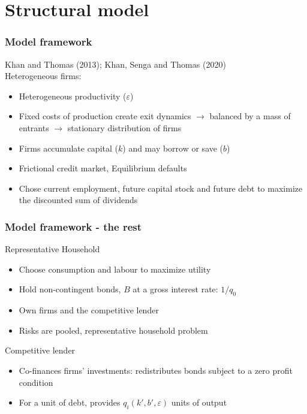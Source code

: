 \documentclass[notes]{beamer}
\begin{document}
\section{Structural model}
\begin{frame}
\frametitle{Model framework}
Khan and Thomas (2013); Khan, Senga and Thomas (2020) \vspace{10mm} \\
Heterogeneous firms: 
\begin{itemize}
\item Heterogeneous productivity ($\varepsilon$)
\item Fixed costs of production create exit dynamics $\rightarrow$ balanced by a mass of entrants $\rightarrow$ stationary distribution of firms
\item Firms accumulate capital ($k$) and may borrow or save ($b$)
\item Frictional credit market, Equilibrium defaults
\item Chose current employment, future capital stock and future debt to maximize the discounted sum of dividends
\end{itemize}

\end{frame}

\begin{frame}
\frametitle{Model framework - the rest}
Representative Household
\begin{itemize}
\item Choose consumption and labour to maximize utility
\item Hold non-contingent bonds, $B$ at a gross interest rate: $1/q_0$
\item Own firms and the competitive lender
\item Risks are pooled, representative household problem
\end{itemize} \vspace{3mm}
Competitive lender
\begin{itemize}
\item Co-finances firms' investments: redistributes bonds subject to a zero profit condition
\item For a unit of debt, provides $q_i(k',b',\varepsilon)$ units of output
\end{itemize}
 
\end{frame}
\end{document}
